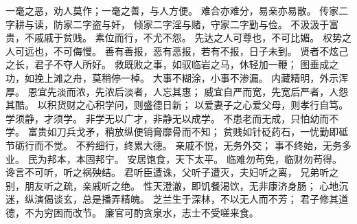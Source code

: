\documentclass[12pt,UTF8]{ctexbook}
\begin{document}
一毫之恶，劝人莫作；一毫之善，与人方便。
难合亦难分，易亲亦易散。
传家二字耕与读，防家二字盗与奸，
倾家二字淫与赌，守家二字勤与俭。
不汲汲于富贵，不戚戚于贫贱。
素位而行，不尤不怨。
先达之人可尊也，不可比媚。
权势之人可远也，不可侮慢。
善有善报，恶有恶报，若有不报，日子未到。
贤者不炫己之长，君子不夺人所好。
救既败之事，如驭临岩之马，休轻加一鞭；
图垂成之功，如挽上滩之舟，莫稍停一棹。
大事不糊涂，小事不渗漏。
内藏精明，外示浑厚。
恩宜先淡而浓，先浓后淡者，人忘其惠；
威宜自严而宽，先宽后严者，人怨其酷。
以积货财之心积学问，则盛德日新；
以爱妻子之心爱父母，则孝行自笃。
学须静，才须学。
非学无以广才，非静无以成学。
不患老而无成，只怕幼而不学。
富贵如刀兵戈矛，稍放纵便销膏靡骨而不知；
贫贱如针砭药石，一忧勤即砥节砺行而不觉。
不矜细行，终累大德。
亲戚不悦，无务外交；
事不终始，无务多业。
民为邦本，本固邦宁。
安居饱食，天下太平。
临难勿苟免，临财勿苟得。
谗言不可听，听之祸殃结。
君听臣遭诛，父听子遭灭，夫妇听之离，
兄弟听之别，朋友听之疏，亲戚听之绝。
性天澄澈，即饥餐渴饮，无非康济身肠；
心地沉迷，纵演偈谈玄，总是播弄精魄。
芝兰生于深林，不以无人而不芳；
君子修其道德，不为穷困而改节。
廉官可酌贪泉水，志士不受嗟来食。

\backmatter
\end{document}
